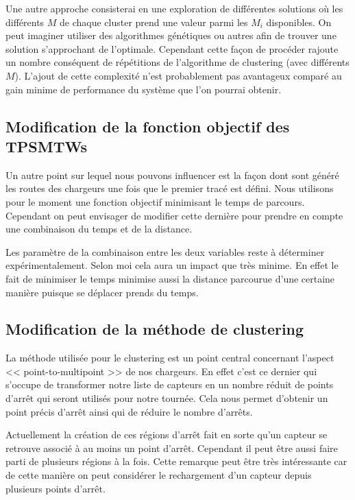 \documentclass[noposter,final]{polytech/polytech}
\begin{document}
			Une autre approche consisterai en une exploration de différentes solutions où les différents $M$ de chaque cluster prend une valeur parmi les $M_i$ disponibles.
			On peut imaginer utiliser des algorithmes génétiques ou autres afin de trouver une solution s'approchant de l'optimale.
			Cependant cette façon de procéder rajoute un nombre conséquent de répétitions de l'algorithme de clustering (avec différents $M$).
			L'ajout de cette complexité n'est probablement pas avantageux comparé au gain minime de performance du système que l'on pourrai obtenir.
						
		\subsection{Modification de la fonction objectif des TPSMTWs}
			Un autre point sur lequel nous pouvons influencer est la façon dont sont généré les routes des chargeurs une fois que le premier tracé est défini.
			Nous utilisons pour le moment une fonction objectif minimisant le temps de parcours.
			Cependant on peut envisager de modifier cette dernière pour prendre en compte une combinaison du temps et de la distance.
			
			Les paramètre de la combinaison entre les deux variables reste à déterminer expérimentalement.
			Selon moi cela aura un impact que très minime.
			En effet le fait de minimiser le temps minimise aussi la distance parcourue d'une certaine manière puisque se déplacer prends du temps.
		
		\subsection{Modification de la méthode de clustering}
			La méthode utilisée pour le clustering est un point central concernant l'aspect << point-to-multipoint >> de nos chargeurs.
			En effet c'est ce dernier qui s'occupe de transformer notre liste de capteurs en un nombre réduit de points d'arrêt qui seront utilisés pour notre tournée.
			Cela nous permet d'obtenir un point précis d'arrêt ainsi qui de réduire le nombre d'arrêts.
			
			Actuellement la création de ces régions d'arrêt fait en sorte qu'un capteur se retrouve associé à au moins un point d'arrêt.
			Cependant il peut être aussi faire parti de plusieurs régions à la fois. 
			Cette remarque peut être très intéressante car de cette manière on peut considérer le rechargement d'un capteur depuis plusieurs points d'arrêt.
			
\end{document}
